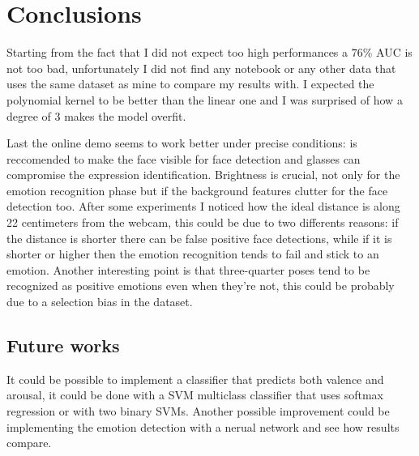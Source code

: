 \section{Conclusions}
Starting from the fact that I did not expect too high performances a $76\%$ AUC is not too bad, unfortunately I did not find any notebook or any other data that uses the same dataset as mine to compare my results with.
I expected the polynomial kernel to be better than the linear one and I was surprised of how a degree of 3 makes the model overfit.

Last the online demo seems to work better under precise conditions: is reccomended to make the face visible for face detection and glasses can compromise the expression identification. 
Brightness is crucial, not only for the emotion recognition phase but if the background features clutter for the face detection too.
After some experiments I noticed how the ideal distance is along 22 centimeters from the webcam, this could be due to two differents reasons: if the distance is shorter there can be false positive face detections, while if it is shorter or higher then the emotion recognition tends to fail and stick to an emotion.
Another interesting point is that three-quarter poses tend to be recognized as positive emotions even when they're not, this could be probably due to a selection bias in the dataset.

\subsection{Future works}
It could be possible to implement a classifier that predicts both valence and arousal, it could be done with a SVM multiclass classifier that uses softmax regression or with two binary SVMs.
Another possible improvement could be implementing the emotion detection with a nerual network and see how results compare.
